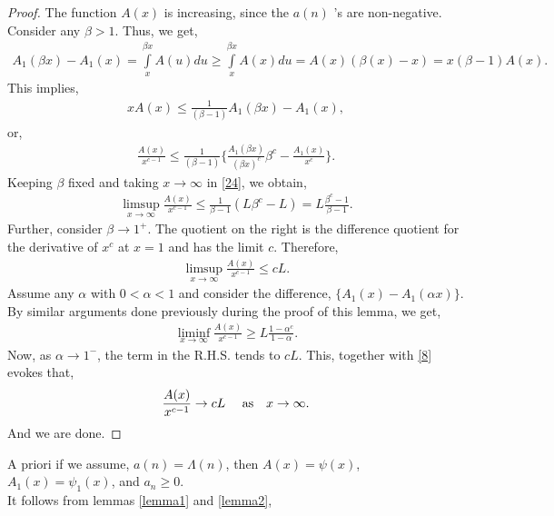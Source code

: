 \documentclass[article,12pt]{elsarticle}
\begin{document}
	\begin{proof}
		The function $A(x)$ is increasing, since the $a(n)$ 's are non-negative. Consider any $\beta >1$. Thus, we get,
		\begin{align*}
			A_{1}(\beta x)-A_{1}(x)=\int\limits_{x}^{\beta x}A(u)du\geq \int\limits_{x}^{\beta x}A(x)du=A(x)(\beta (x)-x)
			=x(\beta -1)A(x).
		\end{align*}
		This implies,
		\begin{align*}
			xA(x)\leq \frac{1}{(\beta -1)}{A_{1}(\beta x)-A_{1}(x)},
		\end{align*}
		or,
		\begin{align*}\label{24}
			\frac{A(x)}{x^{c-1}}\leq \frac{1}{(\beta -1)}\{\frac{A_{1}(\beta x)}{(\beta x )^{c}}\beta ^{c}-\frac{A_{1}(x)}{x^{c}}\}.
		\end{align*}	
		Keeping $\beta $ fixed and taking $x\rightarrow \infty$ in \eqref{24}, we obtain,
		\begin{align}
			\limsup\limits_{x\rightarrow \infty}\frac{A(x)}{x^{c-1}}\leq \frac{1}{\beta -1}(L\beta ^{c}- L)=L\frac{\beta^{c}-1}{\beta -1}.
		\end{align}	
		Further, consider $\beta \rightarrow 1^{+}$. The quotient on the right is the difference quotient for the derivative of $x^{c}$ at $x=1$ and has the limit $c$. Therefore,
		\begin{eqnarray}\label{8}
			\limsup\limits_{x\rightarrow \infty}\frac{A(x)}{x^{c-1}}\leq cL.
		\end{eqnarray}
		Assume any $\alpha$ with $0<\alpha <1$ and consider the difference, $\{A_{1}(x)-A_{1}(\alpha x)\}$. By similar arguments done previously during the proof of this lemma, we get,
		\begin{align}
			\liminf\limits_{x\rightarrow \infty}\frac{A(x)}{x^{c-1}}\geq L\frac{1-\alpha ^{c}}{1-\alpha}.
		\end{align}	
		Now, as $\alpha\rightarrow 1^{-}$, the term in the R.H.S. tends to $cL$. This, together with \eqref{8} evokes that,
		\begin{align}
			\frac{A(x)}{x^{c-1}} \rightarrow cL\mbox{\hspace{10pt} as\hspace{10pt}} x\rightarrow \infty.
		\end{align} 
		And we are done.
	\end{proof}
	A priori if we assume, $a(n)=\Lambda(n)$, then $A(x)=\psi(x)$, $A_{1}(x)=\psi_{1}(x)$, and $a_{n}\geq 0$.\\
	It follows from lemmas \eqref{lemma1} and \eqref{lemma2},
\end{document}
